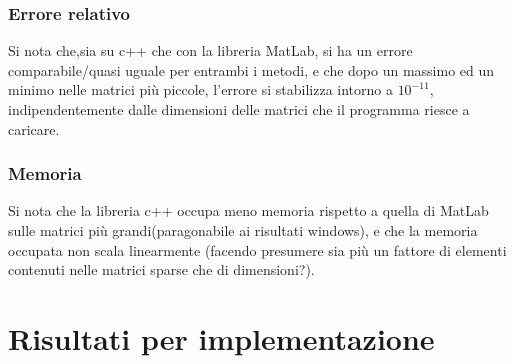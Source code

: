 \documentclass[11pt,italian]{article}
\begin{document}
\subsubsection*{Errore relativo}
Si nota che,sia su c++ che con la libreria MatLab, si ha un errore comparabile/quasi uguale per entrambi i metodi, e che dopo un massimo ed un minimo nelle matrici più piccole, l'errore si stabilizza intorno a $10^{-11}$, indipendentemente dalle dimensioni delle matrici che il programma riesce a caricare.
\begin{figure}[H]
\end{figure}

\subsubsection*{Memoria}
Si nota che la libreria c++ occupa meno memoria rispetto a quella di MatLab sulle matrici più grandi(paragonabile ai risultati windows), e che la memoria occupata non scala linearmente (facendo presumere sia più un fattore di elementi contenuti nelle matrici sparse che di dimensioni?).
\begin{figure}[H]
\end{figure}

\newpage
\section{Risultati per implementazione}
\label{section-results-os}
\end{document}
